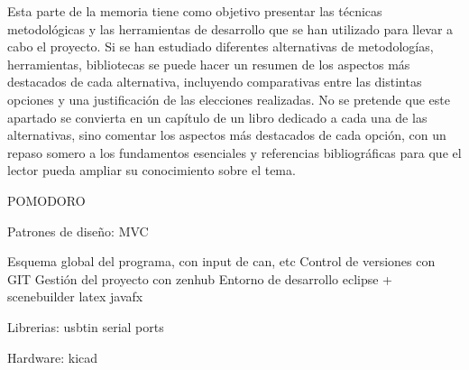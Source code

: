 
Esta parte de la memoria tiene como objetivo presentar las técnicas metodológicas y las herramientas de desarrollo que se han utilizado para llevar a cabo el proyecto. Si se han estudiado diferentes alternativas de metodologías, herramientas, bibliotecas se puede hacer un resumen de los aspectos más destacados de cada alternativa, incluyendo comparativas entre las distintas opciones y una justificación de las elecciones realizadas. 
No se pretende que este apartado se convierta en un capítulo de un libro dedicado a cada una de las alternativas, sino comentar los aspectos más destacados de cada opción, con un repaso somero a los fundamentos esenciales y referencias bibliográficas para que el lector pueda ampliar su conocimiento sobre el tema.




POMODORO

Patrones de diseño:
MVC

Esquema global del programa, con input de can, etc
Control de versiones con GIT
Gestión del proyecto con zenhub
Entorno de desarrollo eclipse + scenebuilder
latex
javafx

Librerias:
usbtin
serial ports

Hardware:
kicad
